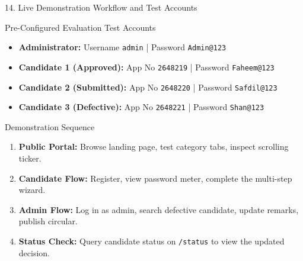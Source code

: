 \documentclass[aspectratio=169, 10pt]{beamer}
\begin{document}
\begin{frame}{14. Live Demonstration Workflow and Test Accounts}
  \small
  \begin{block}{Pre-Configured Evaluation Test Accounts}
    \begin{itemize}
      \item \textbf{Administrator:} Username \texttt{admin} \;|\; Password \texttt{Admin@123}
      \item \textbf{Candidate 1 (Approved):} App No \texttt{2648219} \;|\; Password \texttt{Faheem@123}
      \item \textbf{Candidate 2 (Submitted):} App No \texttt{2648220} \;|\; Password \texttt{Safdil@123}
      \item \textbf{Candidate 3 (Defective):} App No \texttt{2648221} \;|\; Password \texttt{Shan@123}
    \end{itemize}
  \end{block}
  \begin{exampleblock}{Demonstration Sequence}
    \begin{enumerate}
      \item \textbf{Public Portal:} Browse landing page, test category tabs, inspect scrolling ticker.
      \item \textbf{Candidate Flow:} Register, view password meter, complete the multi-step wizard.
      \item \textbf{Admin Flow:} Log in as admin, search defective candidate, update remarks, publish circular.
      \item \textbf{Status Check:} Query candidate status on \texttt{/status} to view the updated decision.
    \end{enumerate}
  \end{exampleblock}
\end{frame}
\end{document}
